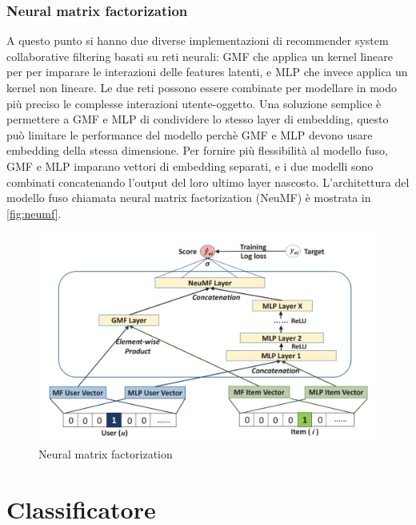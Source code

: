 \documentclass[12pt,italian]{report}
\begin{document}
\subsection{Neural matrix factorization}
A questo punto si hanno due diverse implementazioni di recommender system collaborative filtering basati su reti neurali: GMF che applica un kernel lineare per per imparare le interazioni delle features latenti, e MLP che invece applica un kernel non lineare. Le due reti possono essere combinate per modellare in modo più preciso le complesse interazioni utente-oggetto. Una soluzione semplice è permettere a GMF e MLP di condividere lo stesso layer di embedding, questo può limitare le performance del modello perchè GMF e MLP devono usare embedding della stessa dimensione. Per fornire più flessibilità al modello fuso, GMF e MLP imparano vettori di embedding separati, e i due modelli sono combinati concatenando l'output del loro ultimo layer nascosto. L'architettura del modello fuso chiamata neural matrix factorization (NeuMF) è mostrata in \autoref{fig:neumf}.

\begin{figure}
  \includegraphics[width=\linewidth]{immagini/neumf.png}
  \caption{Neural matrix factorization}
  \label{fig:neumf}
\end{figure}

% 
% 

\chapter{Classificatore}
\label{chap:classificatore}



% 
% 
\end{document}
